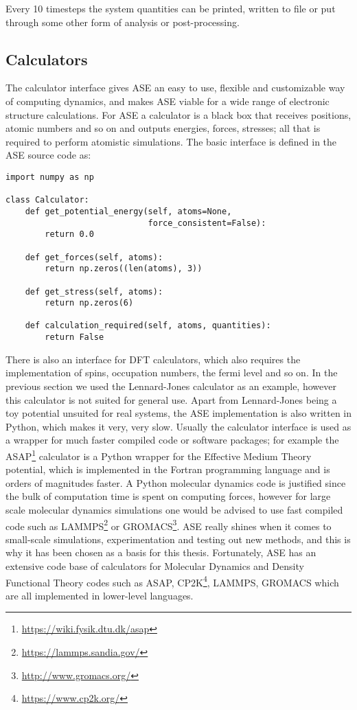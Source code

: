 Every 10 timesteps the system quantities can be printed, written to file
or put through some other form of analysis or post-processing.

\subsection{Calculators}
The calculator interface gives ASE an easy to use,
flexible and customizable way of computing dynamics,
and makes ASE viable for a wide range of electronic structure calculations.
For ASE a calculator is a black box that receives positions, atomic
numbers and so on and outputs energies, forces, stresses;
all that is required to perform atomistic simulations.
The basic interface is defined in the ASE source code as:

\begin{verbatim}
import numpy as np

class Calculator:
    def get_potential_energy(self, atoms=None, 
                             force_consistent=False):
        return 0.0

    def get_forces(self, atoms):
        return np.zeros((len(atoms), 3))

    def get_stress(self, atoms):
        return np.zeros(6)

    def calculation_required(self, atoms, quantities):
        return False
\end{verbatim}

There is also an interface for DFT calculators, which also
requires the implementation of spins, occupation numbers,
the fermi level and so on.
\newline
\newline
In the previous section we used the Lennard-Jones calculator
as an example, however this calculator is not suited for general use.
Apart from Lennard-Jones being a toy potential unsuited
for real systems, the ASE implementation is also written in
Python, which makes it very, very slow.
Usually the calculator interface is used as a wrapper for much faster
compiled code or software packages; for example the
ASAP\footnote{\url{https://wiki.fysik.dtu.dk/asap}}
calculator is a Python wrapper for the Effective Medium Theory
potential, which is implemented in the Fortran programming language
and is orders of magnitudes faster.
A Python molecular dynamics code is justified
since the bulk of computation time is spent on computing forces,
however for large scale molecular dynamics simulations
one would be advised to use fast compiled code such as LAMMPS\footnote{
\url{https://lammps.sandia.gov/}} or GROMACS\footnote{
\url{http://www.gromacs.org/}}.
ASE really shines when it comes to small-scale simulations,
experimentation and testing out new methods, and this is why
it has been chosen as a basis for this thesis.
Fortunately, ASE has an extensive code base of calculators
for Molecular Dynamics and Density Functional Theory codes
such as ASAP, CP2K\footnote{\url{https://www.cp2k.org/}},
LAMMPS, GROMACS which are all implemented in lower-level languages.
